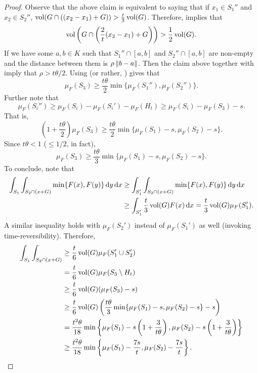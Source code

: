 \begin{proof}
	Observe that the above claim is equivalent to saying that if $x_1\in S_1''$ and $x_2\in S_2''$, $\operatorname{vol}(G\cap ((x_2-x_1) + G)) > \frac{t}{3}\operatorname{vol}(G)$. Therefore,  implies that
	\[ \operatorname{vol}\left(G\cap \left(\frac{2}{t}(x_2-x_1) + G\right)\right) > \frac{1}{2}\operatorname{vol}(G). \]
	If we have some $a,b\in K$ such that $S_1''\cap[a,b]$ and $S_2''\cap[a,b]$ are non-empty and the distance between them is $\rho\left\lVert b-a\right\rVert$. Then the claim above together with  imply that $\rho>t\theta/2$. Using  (or rather, ) gives that
	\[ \mu_F(S_3) \geq \frac{t\theta}{2} \min\{\mu_F(S_1''), \mu_F(S_2'')\}. \]
	Further note that
	\[ \mu_F(S_i'') \geq \mu_F(S_i) - \mu_F(S_i') - \mu_F(H_t) \geq \mu_F(S_i) - \mu_F(S_3) - s. \]
	That is,
	\[ \left(1+\frac{t\theta}{2}\right) \mu_F(S_3) \geq \frac{t\theta}{2} \min\{\mu_F(S_1)-s, \mu_F(S_2)-s\}. \]
	Since $t\theta < 1$ ($\leq 1/2$, in fact),
	\[ \mu_F(S_3) \geq \frac{t\theta}{3} \min\{\mu_F(S_1)-s, \mu_F(S_2)-s\}. \]
	To conclude, note that
	\begin{align*}
		\int_{S_1} \int_{S_2\cap (x+G)} \min\{F(x), F(y)\} \operatorname{d}\!{y}\operatorname{d}\!{x} &\geq \int_{S_1'} \int_{S_2\cap (x+G)} \min\{F(x),F(y)\} \operatorname{d}\!{y}\operatorname{d}\!{x} \\
			&\geq \int_{S_1'} \frac{t}{3} \operatorname{vol}(G) F(x) \operatorname{d}\!{x} = \frac{t}{3}\operatorname{vol}(G)\mu_F(S_1'). 
	\end{align*}
	A similar inequality holds with $\mu_F(S_2')$ instead of $\mu_F(S_1')$ as well (invoking time-reversibility). Therefore,
	\begin{align*}
		\int_{S_1} \int_{S_2\cap (x+G)} &\geq \frac{t}{6}\operatorname{vol}(G)\mu_F(S_1'\cup S_2') \\
			&= \frac{t}{6}\operatorname{vol}(G)\mu_F(S_3\setminus H_t) \\
			&\geq \frac{t}{6}\operatorname{vol}(G)(\mu_F(S_3) - s) \\
			&\geq \frac{t}{6}\operatorname{vol}(G)\left(\frac{t\theta}{3}\min\{\mu_F(S_1)-s,\mu_F(S_2)-s\} - s\right) \\
			&= \frac{t^2\theta}{18}  \min\left\{\mu_F(S_1)-s\left(1+\frac{3}{t\theta}\right), \mu_F(S_2)-s\left(1+\frac{3}{t\theta}\right)\right\} \\
			&\geq \frac{t^2\theta}{18}  \min\left\{\mu_F(S_1)-\frac{7s}{t}, \mu_F(S_2)-\frac{7s}{t}\right\}.
	\end{align*}

\end{proof}
